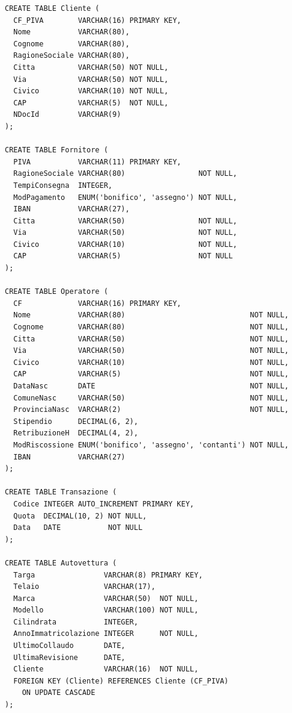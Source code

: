     \begin{lstlisting}
CREATE TABLE Cliente (
  CF_PIVA        VARCHAR(16) PRIMARY KEY,
  Nome           VARCHAR(80),
  Cognome        VARCHAR(80),
  RagioneSociale VARCHAR(80),
  Citta          VARCHAR(50) NOT NULL,
  Via            VARCHAR(50) NOT NULL,
  Civico         VARCHAR(10) NOT NULL,
  CAP            VARCHAR(5)  NOT NULL,
  NDocId         VARCHAR(9)
);

CREATE TABLE Fornitore (
  PIVA           VARCHAR(11) PRIMARY KEY,
  RagioneSociale VARCHAR(80)                 NOT NULL,
  TempiConsegna  INTEGER,
  ModPagamento   ENUM('bonifico', 'assegno') NOT NULL,
  IBAN           VARCHAR(27),
  Citta          VARCHAR(50)                 NOT NULL,
  Via            VARCHAR(50)                 NOT NULL,
  Civico         VARCHAR(10)                 NOT NULL,
  CAP            VARCHAR(5)                  NOT NULL
);

CREATE TABLE Operatore (
  CF             VARCHAR(16) PRIMARY KEY,
  Nome           VARCHAR(80)                             NOT NULL,
  Cognome        VARCHAR(80)                             NOT NULL,
  Citta          VARCHAR(50)                             NOT NULL,
  Via            VARCHAR(50)                             NOT NULL,
  Civico         VARCHAR(10)                             NOT NULL,
  CAP            VARCHAR(5)                              NOT NULL,
  DataNasc       DATE                                    NOT NULL,
  ComuneNasc     VARCHAR(50)                             NOT NULL,
  ProvinciaNasc  VARCHAR(2)                              NOT NULL,
  Stipendio      DECIMAL(6, 2),
  RetribuzioneH  DECIMAL(4, 2),
  ModRiscossione ENUM('bonifico', 'assegno', 'contanti') NOT NULL,
  IBAN           VARCHAR(27)
);

CREATE TABLE Transazione (
  Codice INTEGER AUTO_INCREMENT PRIMARY KEY,
  Quota  DECIMAL(10, 2) NOT NULL,
  Data   DATE           NOT NULL
);

CREATE TABLE Autovettura (
  Targa                VARCHAR(8) PRIMARY KEY,
  Telaio               VARCHAR(17),
  Marca                VARCHAR(50)  NOT NULL,
  Modello              VARCHAR(100) NOT NULL,
  Cilindrata           INTEGER,
  AnnoImmatricolazione INTEGER      NOT NULL,
  UltimoCollaudo       DATE,
  UltimaRevisione      DATE,
  Cliente              VARCHAR(16)  NOT NULL,
  FOREIGN KEY (Cliente) REFERENCES Cliente (CF_PIVA)
    ON UPDATE CASCADE
);


\end{lstlisting}
